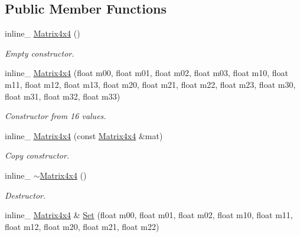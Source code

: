 \subsection*{Public Member Functions}
\begin{DoxyCompactItemize}
\item 
inline\+\_\+ \hyperlink{classMatrix4x4_af12c3d04822f0fb2ee4e31f21117a889}{Matrix4x4} ()\hypertarget{classMatrix4x4_af12c3d04822f0fb2ee4e31f21117a889}{}\label{classMatrix4x4_af12c3d04822f0fb2ee4e31f21117a889}

\begin{DoxyCompactList}\small\item\em Empty constructor. \end{DoxyCompactList}\item 
inline\+\_\+ \hyperlink{classMatrix4x4_a99cc95e0b21467d1b25558aacfac7f1b}{Matrix4x4} (float m00, float m01, float m02, float m03, float m10, float m11, float m12, float m13, float m20, float m21, float m22, float m23, float m30, float m31, float m32, float m33)\hypertarget{classMatrix4x4_a99cc95e0b21467d1b25558aacfac7f1b}{}\label{classMatrix4x4_a99cc95e0b21467d1b25558aacfac7f1b}

\begin{DoxyCompactList}\small\item\em Constructor from 16 values. \end{DoxyCompactList}\item 
inline\+\_\+ \hyperlink{classMatrix4x4_a0d1bf6d849f305966d9cd641167372b1}{Matrix4x4} (const \hyperlink{classMatrix4x4}{Matrix4x4} \&mat)\hypertarget{classMatrix4x4_a0d1bf6d849f305966d9cd641167372b1}{}\label{classMatrix4x4_a0d1bf6d849f305966d9cd641167372b1}

\begin{DoxyCompactList}\small\item\em Copy constructor. \end{DoxyCompactList}\item 
inline\+\_\+ \hyperlink{classMatrix4x4_a6f86a878ccf07228c7ae1179c3ef246d}{$\sim$\+Matrix4x4} ()\hypertarget{classMatrix4x4_a6f86a878ccf07228c7ae1179c3ef246d}{}\label{classMatrix4x4_a6f86a878ccf07228c7ae1179c3ef246d}

\begin{DoxyCompactList}\small\item\em Destructor. \end{DoxyCompactList}\item 
inline\+\_\+ \hyperlink{classMatrix4x4}{Matrix4x4} \& \hyperlink{classMatrix4x4_ad5090f474b46193e3a2f03f410d1800a}{Set} (float m00, float m01, float m02, float m10, float m11, float m12, float m20, float m21, float m22)\hypertarget{classMatrix4x4_ad5090f474b46193e3a2f03f410d1800a}{}\label{classMatrix4x4_ad5090f474b46193e3a2f03f410d1800a}


\end{DoxyCompactItemize}
